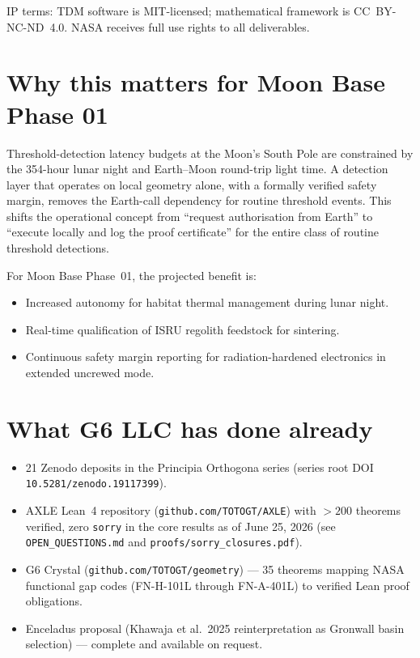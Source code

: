\documentclass[11pt,a4paper]{article}
\begin{document}
IP terms: TDM software is MIT-licensed; mathematical framework is CC~BY-NC-ND~4.0.
NASA receives full use rights to all deliverables.

\section{Why this matters for Moon Base Phase 01}

Threshold-detection latency budgets at the Moon's South Pole are constrained
by the 354-hour lunar night and Earth--Moon round-trip light time.  A
detection layer that operates on local geometry alone, with a formally
verified safety margin, removes the Earth-call dependency for routine
threshold events.  This shifts the operational concept from
``request authorisation from Earth'' to ``execute locally and log the
proof certificate'' for the entire class of routine threshold detections.

For Moon Base Phase~01, the projected benefit is:
\begin{itemize}
  \item Increased autonomy for habitat thermal management during lunar night.
  \item Real-time qualification of ISRU regolith feedstock for sintering.
  \item Continuous safety margin reporting for radiation-hardened
    electronics in extended uncrewed mode.
\end{itemize}

\section{What G6 LLC has done already}

\begin{itemize}
  \item 21 Zenodo deposits in the Principia Orthogona series
    (series root DOI \texttt{10.5281/zenodo.19117399}).
  \item AXLE Lean~4 repository (\texttt{github.com/TOTOGT/AXLE}) with
    $>200$ theorems verified, zero \texttt{sorry} in the core results
    as of June 25, 2026 (see \texttt{OPEN\_QUESTIONS.md} and
    \texttt{proofs/sorry\_closures.pdf}).
  \item G6 Crystal (\texttt{github.com/TOTOGT/geometry}) --- 35
    theorems mapping NASA functional gap codes (FN-H-101L through
    FN-A-401L) to verified Lean proof obligations.
  \item Enceladus proposal (Khawaja et al.\ 2025 reinterpretation as
    Gronwall basin selection) --- complete and available on request.
\end{itemize}
\end{document}

